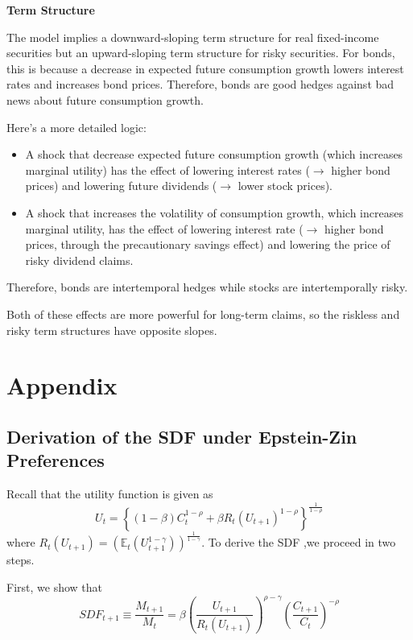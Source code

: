 \documentclass[
]{book}
\providecommand{\tightlist}{%
  \setlength{\itemsep}{0pt}\setlength{\parskip}{0pt}}
\begin{document}
\textbf{Term Structure}

The model implies a downward-sloping term structure for real fixed-income securities but an upward-sloping term structure for risky securities. For bonds, this is because a decrease in expected future consumption growth lowers interest rates and increases bond prices. Therefore, bonds are good hedges against bad news about future consumption growth.

Here's a more detailed logic:

\begin{itemize}
\tightlist
\item
  A shock that decrease expected future consumption growth (which increases marginal utility) has the effect of lowering interest rates (\(\rightarrow\) higher bond prices) and lowering future dividends (\(\to\) lower stock prices).
\item
  A shock that increases the volatility of consumption growth, which increases marginal utility, has the effect of lowering interest rate (\(\to\) higher bond prices, through the precautionary savings effect) and lowering the price of risky dividend claims.
\end{itemize}

Therefore, bonds are intertemporal hedges while stocks are intertemporally risky.

Both of these effects are more powerful for long-term claims, so the riskless and risky term structures have opposite slopes.

\hypertarget{appendix}{%
\section{Appendix}\label{appendix}}

\hypertarget{derivation-of-the-sdf-under-epstein-zin-preferences}{%
\subsection{Derivation of the SDF under Epstein-Zin Preferences}\label{derivation-of-the-sdf-under-epstein-zin-preferences}}

Recall that the utility function is given as
\[
U_{t}=\left\{ \left(1-\beta\right)C_{t}^{1-\rho}+\beta R_{t}\left(U_{t+1}\right)^{1-\rho}\right\} ^{\frac{1}{1-\rho}}
\]
where \(R_{t}\left(U_{t+1}\right)=\left(\mathbb{E}_{t}\left(U_{t+1}^{1-\gamma}\right)\right)^{\frac{1}{1-\gamma}}\). To derive the SDF ,we proceed in two steps.

First, we show that
\[
SDF_{t+1}\equiv\frac{M_{t+1}}{M_{t}}=\beta\left(\frac{U_{t+1}}{R_{t}\left(U_{t+1}\right)}\right)^{\rho-\gamma}\left(\frac{C_{t+1}}{C_{t}}\right)^{-\rho}
\]
\end{document}
